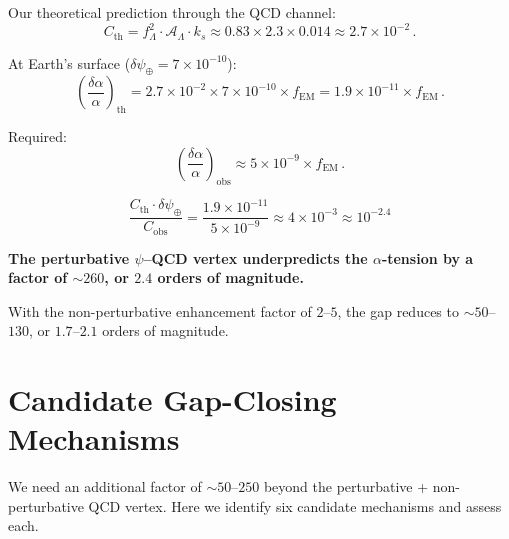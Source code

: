 \documentclass[aps,prd,twocolumn,superscriptaddress,floatfix,nofootinbib]{revtex4-2}
\newcommand{\fEM}{f_{\mathrm{EM}}}
\newcommand{\ks}{k_s}
\newcommand{\dpsi}{\delta\psi}
\newcommand{\dalpha}{\delta\alpha}
\newcommand{\alphafine}{\alpha}
\begin{document}
Our theoretical prediction through the QCD channel:
\begin{equation}
C_{\mathrm{th}} = f_\Lambda^2 \cdot \mathcal{A}_\Lambda \cdot \ks
\approx 0.83 \times 2.3 \times 0.014 \approx 2.7 \times 10^{-2} \, .
\end{equation}

At Earth's surface ($\dpsi_\oplus = 7 \times 10^{-10}$):
\begin{equation}
\left(\frac{\dalpha}{\alphafine}\right)_{\mathrm{th}}
= 2.7 \times 10^{-2} \times 7 \times 10^{-10} \times \fEM
= 1.9 \times 10^{-11} \times \fEM \, .
\end{equation}

Required:
\begin{equation}
\left(\frac{\dalpha}{\alphafine}\right)_{\mathrm{obs}}
\approx 5 \times 10^{-9} \times \fEM \, .
\end{equation}

\begin{tcolorbox}[colback=red!5!white, colframe=red!60!black,
  title=The Remaining Magnitude Gap]
\begin{equation}
\boxed{
\frac{C_{\mathrm{th}} \cdot \dpsi_\oplus}{C_{\mathrm{obs}}}
= \frac{1.9 \times 10^{-11}}{5 \times 10^{-9}}
\approx 4 \times 10^{-3}
\approx 10^{-2.4}
}
\end{equation}

\textbf{The perturbative $\psi$--QCD vertex underpredicts the $\alpha$-tension
by a factor of $\sim 260$, or $2.4$ orders of magnitude.}

With the non-perturbative enhancement factor of $2$--$5$, the gap reduces to
$\sim 50$--$130$, or $1.7$--$2.1$ orders of magnitude.
\end{tcolorbox}


\section{Candidate Gap-Closing Mechanisms}\label{sec:gap_mechanisms}

We need an additional factor of $\sim 50$--$250$ beyond the perturbative +
non-perturbative QCD vertex. Here we identify six candidate mechanisms and
assess each.
\end{document}
